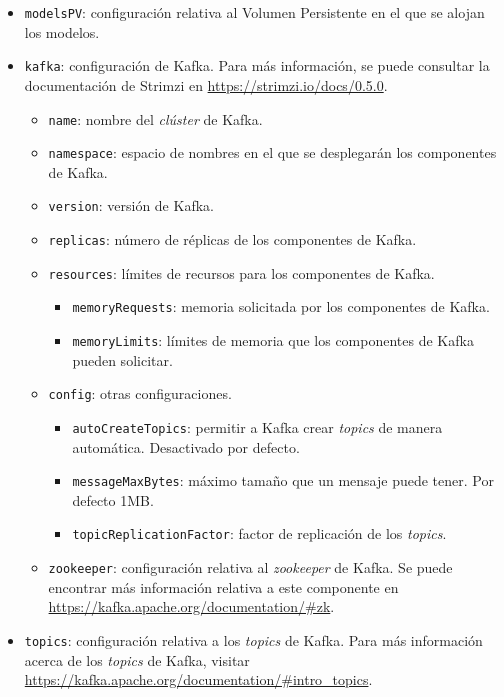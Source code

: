 \begin{itemize} [\textbullet]
	\item \texttt{modelsPV}: configuración relativa al Volumen Persistente en el que se alojan los modelos.
	
	\item \texttt{kafka}: configuración de Kafka. Para más información, se puede consultar la documentación de Strimzi en \href{https://strimzi.io/docs/0.5.0}{https://strimzi.io/docs/0.5.0}.
	\begin{itemize} [◦]
		\item \texttt{name}: nombre del \emph{clúster} de Kafka.
		\item \texttt{namespace}: espacio de nombres en el que se desplegarán los componentes de Kafka.
		\item \texttt{version}: versión de Kafka.
		\item \texttt{replicas}: número de réplicas de los componentes de Kafka.
		\item \texttt{resources}: límites de recursos para los componentes de Kafka.
		\begin{itemize} [-]
			\item \texttt{memoryRequests}: memoria solicitada por los componentes de Kafka.
			\item \texttt{memoryLimits}: límites de memoria que los componentes de Kafka pueden solicitar.
		\end{itemize}
		\item \texttt{config}: otras configuraciones.
		\begin{itemize} [-]
			\item \texttt{autoCreateTopics}: permitir a Kafka crear \emph{topics} de manera automática. Desactivado por defecto.
			\item \texttt{messageMaxBytes}: máximo tamaño que un mensaje puede tener. Por defecto 1MB.
			\item \texttt{topicReplicationFactor}: factor de replicación de los \emph{topics}.
		\end{itemize}
		\item \texttt{zookeeper}: configuración relativa al \emph{zookeeper} de Kafka. Se puede encontrar más información relativa a este componente en \href{https://kafka.apache.org/documentation/#zk}{https://kafka.apache.org/documentation/\#zk}.
	\end{itemize}
	\item \texttt{topics}: configuración relativa a los \emph{topics} de Kafka. Para más información acerca de los \emph{topics} de Kafka, visitar \href{https://kafka.apache.org/documentation/#intro_topics}{https://kafka.apache.org/\newline documentation/\#intro\_topics}.

\end{itemize}
